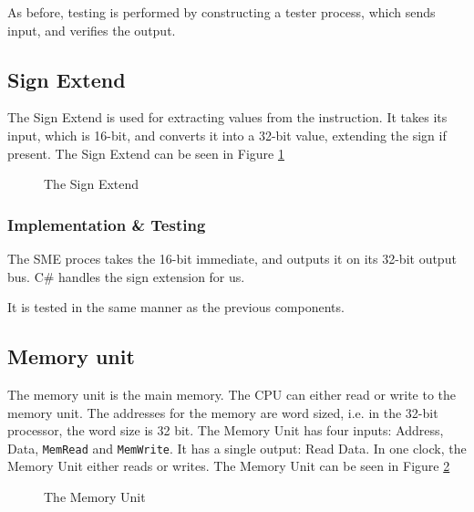 As before, testing is performed by constructing a tester process, which sends
input, and verifies the output.

\subsection{Sign Extend}
The Sign Extend is used for extracting values from the instruction. It takes
its input, which is 16-bit, and converts it into a 32-bit value, extending the
sign if present. The Sign Extend can be seen in Figure \ref{fig:sign}
\begin{figure}
    \centering
    \caption{The Sign Extend}
    \label{fig:sign}
\end{figure}

\subsubsection*{Implementation \& Testing}
The SME proces takes the 16-bit immediate, and outputs it on its 32-bit output
bus. C\# handles the sign extension for us.

It is tested in the same manner as the previous components.


\subsection{Memory unit}
The memory unit is the main memory. The CPU can either read or write to the
memory unit. The addresses for the memory are word sized, i.e. in the 32-bit
processor, the word size is 32 bit. The Memory Unit has four inputs: Address,
Data, \texttt{MemRead} and \texttt{MemWrite}. It has a single output: Read
Data. In one clock, the Memory Unit either reads or writes. The Memory Unit can
be seen in Figure \ref{fig:mem}
\begin{figure}
    \centering
    \caption{The Memory Unit}
    \label{fig:mem}
\end{figure}

